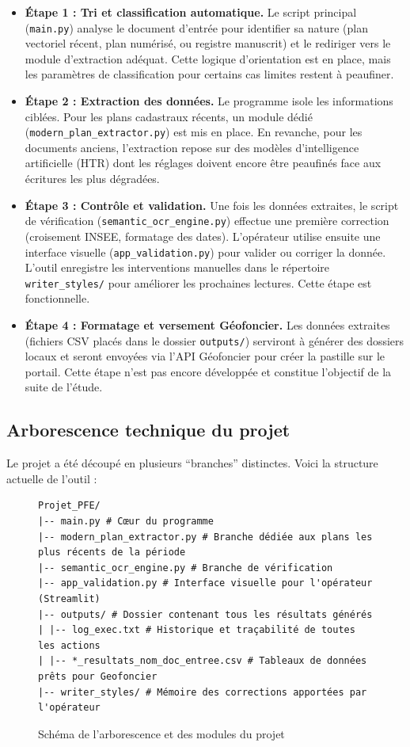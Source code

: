\documentclass[a4paper,11pt]{article}
\begin{document}
\begin{itemize}[leftmargin=1.2em]
  \item \textbf{Étape 1 : Tri et classification automatique.} Le script principal (\texttt{main.py}) analyse le document d'entrée pour identifier sa nature (plan vectoriel récent, plan numérisé, ou registre manuscrit) et le rediriger vers le module d'extraction adéquat. Cette logique d'orientation est en place, mais les paramètres de classification pour certains cas limites restent à peaufiner.
  
  \item \textbf{Étape 2 : Extraction des données.} Le programme isole les informations ciblées. Pour les plans cadastraux récents, un module dédié (\texttt{modern\_plan\_extractor.py}) est mis en place. En revanche, pour les documents anciens, l'extraction repose sur des modèles d'intelligence artificielle (HTR) dont les réglages doivent encore être peaufinés face aux écritures les plus dégradées.
  
  \item \textbf{Étape 3 : Contrôle et validation.} Une fois les données extraites, le script de vérification (\texttt{semantic\_ocr\_engine.py}) effectue une première correction (croisement INSEE, formatage des dates). L'opérateur utilise ensuite une interface visuelle (\texttt{app\_validation.py}) pour valider ou corriger la donnée. L'outil enregistre les interventions manuelles dans le répertoire \texttt{writer\_styles/} pour améliorer les prochaines lectures. Cette étape est fonctionnelle.
  
  \item \textbf{Étape 4 : Formatage et versement Géofoncier.} Les données extraites (fichiers CSV placés dans le dossier \texttt{outputs/}) serviront à générer des dossiers locaux et seront envoyées via l'API Géofoncier pour créer la pastille sur le portail. Cette étape n'est pas encore développée et constitue l'objectif de la suite de l'étude.
\end{itemize}

\subsection{Arborescence technique du projet}
Le projet a été découpé en plusieurs \enquote{branches} distinctes. Voici la structure actuelle de l'outil :

\begin{figure}[H]
\begin{verbatim}
Projet_PFE/
|-- main.py # Cœur du programme 
|-- modern_plan_extractor.py # Branche dédiée aux plans les plus récents de la période 
|-- semantic_ocr_engine.py # Branche de vérification 
|-- app_validation.py # Interface visuelle pour l'opérateur (Streamlit)
|-- outputs/ # Dossier contenant tous les résultats générés
| |-- log_exec.txt # Historique et traçabilité de toutes les actions
| |-- *_resultats_nom_doc_entree.csv # Tableaux de données prêts pour Geofoncier
|-- writer_styles/ # Mémoire des corrections apportées par l'opérateur
\end{verbatim}
\caption{Schéma de l'arborescence et des modules du projet}
\end{figure}
\end{document}
